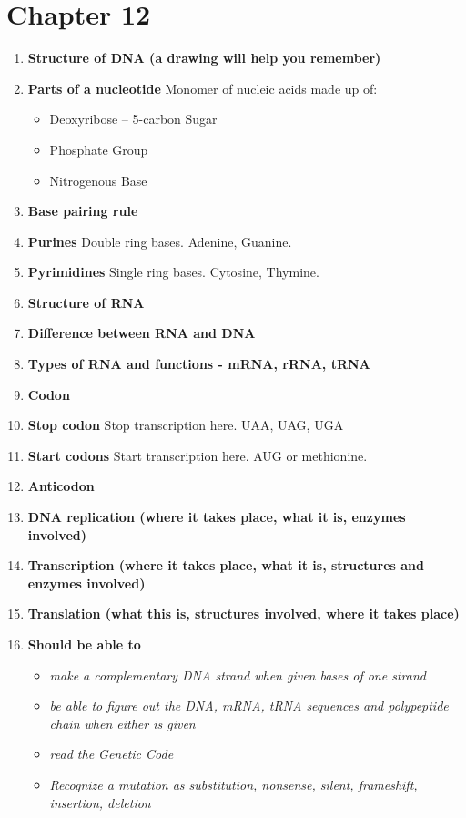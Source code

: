 \documentclass[9pt]{article}
\begin{document}
\section*{Chapter 12}
\begin{enumerate}
  \item {\bf Structure of DNA (a drawing will help you remember)}
  \item {\bf Parts of a nucleotide} Monomer of nucleic acids made up of:
    \begin{itemize}
      \item Deoxyribose – 5-carbon Sugar
      \item Phosphate Group
      \item Nitrogenous Base
    \end{itemize}
  \item {\bf Base pairing rule}
  \item {\bf Purines} Double ring bases. Adenine, Guanine.
  \item {\bf Pyrimidines} Single ring bases. Cytosine, Thymine.
  \item {\bf Structure of RNA}
  \item {\bf Difference between RNA and DNA}
  \item {\bf Types of RNA and functions  -  mRNA, rRNA, tRNA}
  \item {\bf Codon}
  \item {\bf Stop codon} Stop transcription here. UAA, UAG, UGA
  \item {\bf Start codons} Start transcription here. AUG or methionine.
  \item {\bf Anticodon}
  \item {\bf DNA replication (where it takes place, what it is, enzymes involved)}
  \item {\bf Transcription (where it takes place, what it is, structures and enzymes involved)}
  \item {\bf Translation (what this is, structures involved, where it takes place)}
  \item {\bf Should be able to}
    \begin{itemize}
      \item {\em make a complementary DNA strand when given bases of one strand}
      \item {\em be able to figure out the DNA, mRNA, tRNA sequences and polypeptide chain when either is given}
      \item {\em read the Genetic Code}
      \item {\em Recognize a mutation as substitution, nonsense, silent, frameshift, insertion, deletion}
    \end{itemize}
\end{enumerate}
\end{document}
